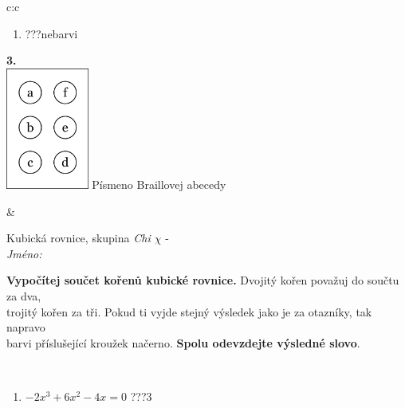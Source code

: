 \documentclass[10pt]{report}
\begin{document}
\begin{tabular}{c:c}
\begin{minipage}[c][104.5mm][t]{0.5\linewidth}
\begin{center}
\begin{minipage}{0.79\linewidth}
\begin{center}
\begin{varwidth}{\linewidth}
\begin{enumerate}
\item \quad \dotfill\; ???\;\dotfill \quad nebarvi
\end{enumerate}
\end{varwidth}
\end{center}
\end{minipage}
\begin{minipage}{0.20\linewidth}
\begin{center}
{\Huge\bfseries 3.} \\[2mm]
\includegraphics[height=40mm]{../images/braille.png}
{\small Písmeno Braillovej abecedy}
\end{center}
\end{minipage}
\end{center}
\end{minipage}
&
\begin{minipage}[c][104.5mm][t]{0.5\linewidth}
\begin{center}
\vspace{7mm}
{\huge Kubická rovnice, skupina \textit{Chi $\chi$} -}\\[5mm]
\textit{Jméno:}\phantom{xxxxxxxxxxxxxxxxxxxxxxxxxxxxxxxxxxxxxxxxxxxxxxxxxxxxxxxxxxxxxxxxx}\\[5mm]
\begin{minipage}{0.95\linewidth}
\begin{center}
\textbf{Vypočítej součet kořenů kubické rovnice.} Dvojitý kořen považuj do součtu za dva,\\trojitý kořen za tři. Pokud ti vyjde stejný výsledek jako je za otazníky, tak napravo\\barvi příslušející kroužek načerno. \textbf{Spolu odevzdejte výsledné slovo}.
\end{center}
\end{minipage}
\\[1mm]
\begin{minipage}{0.79\linewidth}
\begin{center}
\begin{varwidth}{\linewidth}
\begin{enumerate}
\Large
\item $-2x^3+6x^2-4x=0$\quad \dotfill\; ???\;\dotfill \quad $3$

\end{enumerate}
\end{varwidth}
\end{center}
\end{minipage}
\end{center}
\end{minipage}
\end{tabular}
\end{document}
